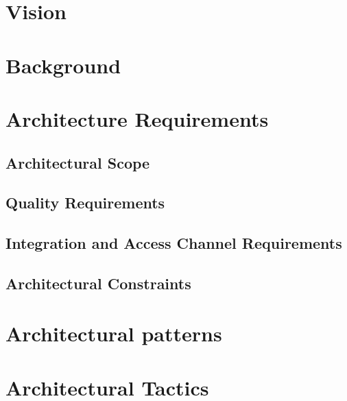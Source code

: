 \documentclass[hidelinks,a4paper,12pt]{article}
\begin{document}
	\section{Vision}%
	
	
	\section{Background} %

	\newpage
	
	\section{Architecture Requirements}%
	\subsection{Architectural Scope}%
	\subsection{Quality Requirements}%
	
	\subsection{Integration and Access Channel Requirements}%
	\subsection{Architectural Constraints }%
	\section{Architectural patterns}%
	\section{Architectural Tactics}%
\end{document}
